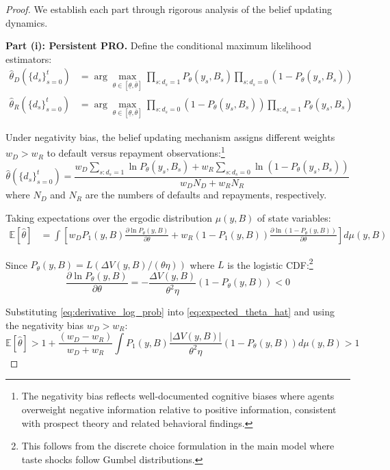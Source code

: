 \documentclass[12pt]{article}
\theoremstyle{plain}
\begin{document}
\begin{proof}
	We establish each part through rigorous analysis of the belief updating dynamics.

	\textbf{Part (i): Persistent PRO.}
	Define the conditional maximum likelihood estimators:
	\begin{align}
		\hat{\theta}_D(\{d_s\}_{s=0}^t) & = \arg\max_{\theta \in [\underline{\theta}, \bar{\theta}]} \prod_{s: d_s=1} P_\theta(y_s, B_s) \prod_{s: d_s=0} (1-P_\theta(y_s, B_s)) \label{eq:mle_default} \\
		\hat{\theta}_R(\{d_s\}_{s=0}^t) & = \arg\max_{\theta \in [\underline{\theta}, \bar{\theta}]} \prod_{s: d_s=0} (1-P_\theta(y_s, B_s)) \prod_{s: d_s=1} P_\theta(y_s, B_s) \label{eq:mle_repay}
	\end{align}

	Under negativity bias, the belief updating mechanism assigns different weights
	$w_D > w_R$ to default versus repayment observations:\footnote{The negativity
		bias reflects well-documented cognitive biases where agents overweight negative
		information relative to positive information, consistent with prospect theory
		and related behavioral findings.}
	\begin{equation}
		\hat{\theta}(\{d_s\}_{s=0}^t) = \frac{w_D \sum_{s: d_s=1} \ln P_\theta(y_s, B_s) + w_R \sum_{s: d_s=0} \ln(1-P_\theta(y_s, B_s))}{w_D N_D + w_R N_R} \label{eq:weighted_mle}
	\end{equation}
	where $N_D$ and $N_R$ are the numbers of defaults and repayments, respectively.

	Taking expectations over the ergodic distribution $\mu(y,B)$ of state
	variables:
	\begin{align}
		\mathbb{E}[\hat{\theta}] & = \int \left[ w_D P_1(y,B) \frac{\partial \ln P_\theta(y,B)}{\partial \theta} + w_R (1-P_1(y,B)) \frac{\partial \ln(1-P_\theta(y,B))}{\partial \theta} \right] d\mu(y,B) \label{eq:expected_theta_hat}
	\end{align}

	Since $P_\theta(y,B) = L(\Delta V(y,B)/(\theta\eta))$ where $L$ is the logistic
	CDF:\footnote{This follows from the discrete choice formulation in the main
		model where taste shocks follow Gumbel distributions.}
	\begin{equation}
		\frac{\partial \ln P_\theta(y,B)}{\partial \theta} = -\frac{\Delta V(y,B)}{\theta^2\eta} (1-P_\theta(y,B)) < 0 \label{eq:derivative_log_prob}
	\end{equation}

	Substituting \eqref{eq:derivative_log_prob} into \eqref{eq:expected_theta_hat}
	and using the negativity bias $w_D > w_R$:
	\begin{equation}
		\mathbb{E}[\hat{\theta}] > 1 + \frac{(w_D - w_R)}{w_D + w_R} \int P_1(y,B) \frac{|\Delta V(y,B)|}{\theta^2\eta} (1-P_\theta(y,B)) d\mu(y,B) > 1 \label{eq:persistent_pessimism}
	\end{equation}


\end{proof}
\end{document}
